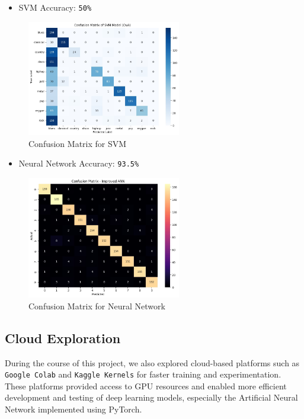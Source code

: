 \documentclass[a4paper]{article}
\theoremstyle{plain}
\theoremstyle{definition}
\begin{document}
\begin{itemize}
    \item SVM Accuracy: \texttt{50\%}
\end{itemize}
\begin{figure}[H]
    \centering
    \includegraphics[width=0.6\textwidth]{svm_cm.png}
    \caption{Confusion Matrix for SVM}
\end{figure}
\begin{itemize}
    \item Neural Network Accuracy: \texttt{93.5\%}
\end{itemize}
\begin{figure}[H]
    \centering
    \includegraphics[width=0.6\textwidth]{nn_cm.png}
    \caption{Confusion Matrix for Neural Network}
\end{figure}

\subsection{Cloud Exploration}
During the course of this project, we also explored cloud-based platforms such as \texttt{Google Colab} and \texttt{Kaggle Kernels} for faster training and experimentation. These platforms provided access to GPU resources and enabled more efficient development and testing of deep learning models, especially the Artificial Neural Network implemented using PyTorch.
\end{document}
